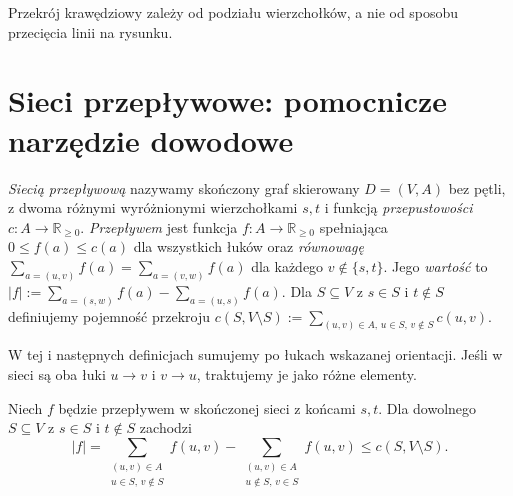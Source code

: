 \begin{center}

{\footnotesize Przekrój krawędziowy zależy od podziału wierzchołków,
a nie od sposobu przecięcia linii na rysunku.}
\end{center}

\section{Sieci przepływowe: pomocnicze narzędzie dowodowe}
\label{sec:tg-flows}

\begin{definicja}
\emph{Siecią przepływową} nazywamy skończony graf skierowany
$D=(V,A)$ bez pętli, z dwoma różnymi wyróżnionymi wierzchołkami
$s,t$ i funkcją \emph{przepustowości}
$c:A\to\mathbb R_{\ge0}$.
\emph{Przepływem} jest funkcja $f:A\to\mathbb R_{\ge0}$
spełniająca $0\le f(a)\le c(a)$ dla wszystkich łuków oraz
\emph{równowagę} $\sum_{a=(u,v)}f(a)=\sum_{a=(v,w)}f(a)$
dla każdego $v\notin\{s,t\}$. Jego \emph{wartość} to
$|f|:=\sum_{a=(s,w)}f(a)-\sum_{a=(u,s)}f(a)$.
Dla $S\subseteq V$ z $s\in S$ i $t\notin S$ definiujemy
pojemność przekroju
$c(S,V\setminus S):=\sum_{(u,v)\in A,\,u\in S,\,v\notin S}c(u,v)$.
\end{definicja}

W tej i następnych definicjach sumujemy po łukach
wskazanej orientacji. Jeśli w sieci są oba łuki $u\to v$
i $v\to u$, traktujemy je jako różne elementy.

\begin{lemat}
\label{lem:tg-cutbound}
Niech $f$ będzie przepływem w skończonej sieci z końcami
$s,t$. Dla dowolnego $S\subseteq V$ z $s\in S$ i $t\notin S$
zachodzi
\[
|f|=\sum_{\substack{(u,v)\in A\\u\in S,\,v\notin S}}f(u,v)
 -\sum_{\substack{(u,v)\in A\\u\notin S,\,v\in S}}f(u,v)
 \le c(S,V\setminus S).
\]
\end{lemat}

